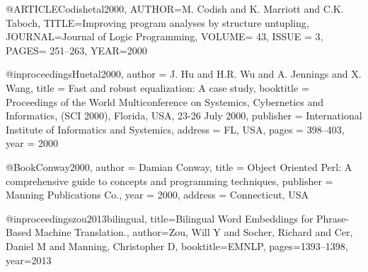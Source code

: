 @ARTICLE{Codishetal2000,
AUTHOR={M. Codish and K. Marriott and C.K. Taboch},
TITLE={Improving program analyses by structure untupling},
JOURNAL={Journal of Logic Programming},
VOLUME= {43},
ISSUE = {3},
PAGES= {251--263},
YEAR={2000}
}

@inproceedings{Huetal2000,
author = {J. Hu and H.R. Wu and A. Jennings and X. Wang},
title = {Fast and robust equalization: A case study},
booktitle = {Proceedings of the World Multiconference on Systemics, Cybernetics and Informatics, (SCI 2000), Florida, USA, 23-26 July 2000},
publisher = {International Institute of Informatics and Systemics},
address = {FL, USA},
pages = {398--403},
year = {2000}
}

@Book{Conway2000,
author = {Damian Conway},
title = {Object {O}riented {P}erl: {A} comprehensive guide to concepts and programming techniques},
publisher = {Manning Publications Co.},
year = {2000},
address = {Connecticut, USA}
}

@inproceedings{zou2013bilingual,
  title={Bilingual Word Embeddings for Phrase-Based Machine Translation.},
  author={Zou, Will Y and Socher, Richard and Cer, Daniel M and Manning, Christopher D},
  booktitle={EMNLP},
  pages={1393--1398},
  year={2013}
}